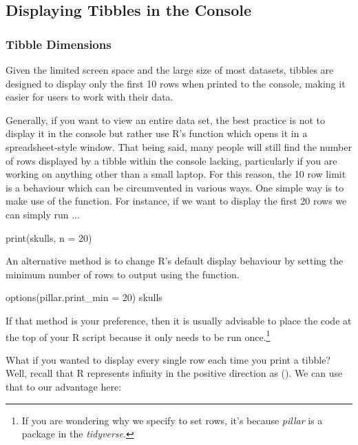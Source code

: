 \subsection{Displaying Tibbles in the Console}

\subsubsection{Tibble Dimensions}

Given the limited screen space and the large size of most datasets, tibbles are designed to display only the first 10 rows when printed to the console, making it easier for users to work with their data.

Generally, if you want to view an entire data set, the best practice is not to display it in the console but rather use R's  function which opens it in a spreadsheet-style window. That being said, many people will still find the number of rows displayed by a tibble within the console lacking, particularly if you are working on anything other than a small laptop. For this reason, the 10 row limit is a behaviour which can be circumvented in various ways. One simple way is to make use of the  function. For instance, if we want to display the first 20 rows we can simply run ...

\begin{inR}
print(skulls, n = 20)
\end{inR}

\vspace{1em}

An alternative method is to change R's default display behaviour by setting the minimum number of rows to output using the  function.

\begin{inR}
options(pillar.print_min = 20)
skulls
\end{inR}

\vspace{1em}

\noindent
If that method is your preference, then it is usually advisable to place the  code at the top of your R script because it only needs to be run once.\footnote{If you are wondering why we specify  to set rows, it's because \textit{pillar} is a package in the \textit{tidyverse}.}

What if you wanted to display every single row each time you print a tibble? Well, recall that R represents infinity in the positive direction as (). We can use that to our advantage here:

